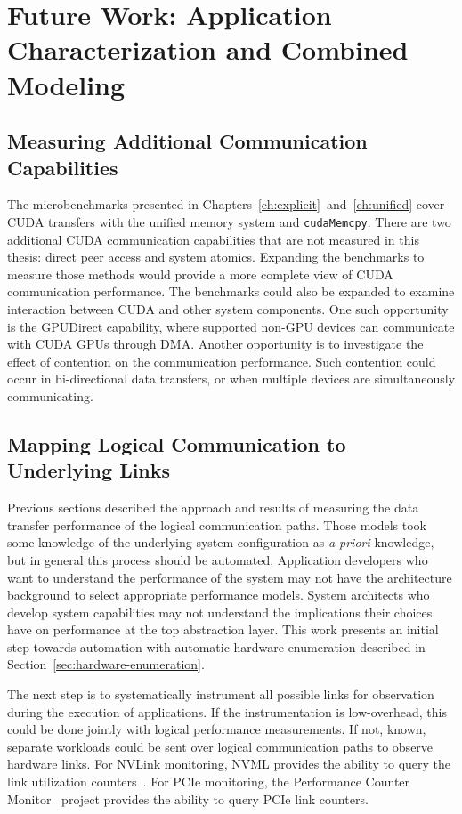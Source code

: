\chapter{Future Work: Application Characterization and Combined Modeling}
\label{ch:future}

\section{Measuring Additional Communication Capabilities}

The microbenchmarks presented in Chapters~\ref{ch:explicit}~and~\ref{ch:unified} cover CUDA transfers with the unified memory system and \texttt{cudaMemcpy}.
There are two additional CUDA communication capabilities that are not measured in this thesis: direct peer access and system atomics.
Expanding the benchmarks to measure those methods would provide a more complete view of CUDA communication performance.
The benchmarks could also be expanded to examine interaction between CUDA and other system components.
One such opportunity is the GPUDirect capability, where supported non-GPU devices can communicate with CUDA GPUs through DMA.
Another opportunity is to investigate the effect of contention on the communication performance.
Such contention could occur in bi-directional data transfers, or when multiple devices are simultaneously communicating.

\section{Mapping Logical Communication to Underlying Links}
\label{sec:map-underlying}

Previous sections described the approach and results of measuring the data transfer performance of the logical communication paths.
Those models took some knowledge of the underlying system configuration as \textit{a priori} knowledge, but in general this process should be automated.
Application developers who want to understand the performance of the system may not have the architecture background to select appropriate performance models.
System architects who develop system capabilities may not understand the implications their choices have on performance at the top abstraction layer.
This work presents an initial step towards automation with automatic hardware enumeration described in Section~\ref{sec:hardware-enumeration}.

The next step is to systematically instrument all possible links for observation during the execution of applications.
If the instrumentation is low-overhead, this could be done jointly with logical performance measurements.
If not, known, separate workloads could be sent over logical communication paths to observe hardware links.
For NVLink monitoring, NVML provides the ability to query the link utilization counters~\cite{nvidia2017nvmlreference}.
For PCIe monitoring, the Performance Counter Monitor~\cite{opcm2018pcm} project provides the ability to query PCIe link counters.

